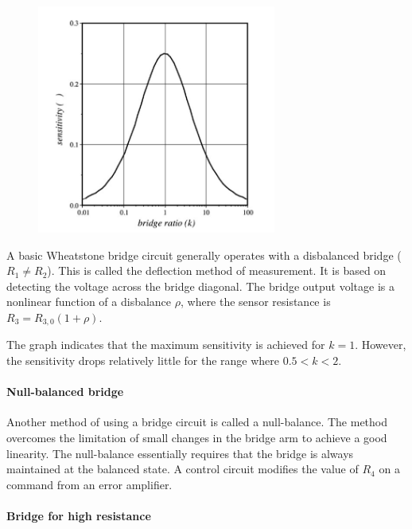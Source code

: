 \begin{minipage}[c]{.45\linewidth}	  
\begin{figure}[H]
    \centering
    \includegraphics[width = 0.7\textwidth]{L4/img/disbalanced.PNG}
\end{figure}
\end{minipage} \hfill
\begin{minipage}[c]{.45\linewidth}
A basic Wheatstone bridge circuit generally operates with a disbalanced
bridge ($R_1 \ne R_2$). This is called the deflection method of measurement. It is based on
 detecting the voltage across the bridge diagonal. The bridge output voltage is a nonlinear function of a disbalance $\rho$, where the sensor resistance is $R_3 = R_{3,0}(1 + \rho)$.

The graph indicates that the maximum sensitivity is achieved for $k=1$. However, the
sensitivity drops relatively little for the range where $0.5 < k < 2$.
\end{minipage}

\paragraph{Null-balanced bridge}

Another method of using a bridge circuit is called a null-balance. The method
overcomes the limitation of small changes in the bridge arm to achieve a good
linearity. The null-balance essentially requires that the bridge is always maintained
at the balanced state. A control circuit modifies the value of $R_4$ on a command from an error
amplifier.
    
\paragraph{Bridge for high resistance}

